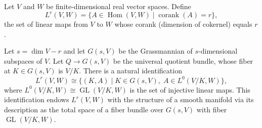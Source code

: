 Let $V$ and $W$ be finite-dimensional real vector spaces. Define
$$
L^r(V, W) = \{ A \in \operatorname{Hom}(V, W) \mid \operatorname{corank}(A) = r \},
$$
the set of linear maps from $V$ to $W$ whose corank (dimension of cokernel) equals $r$.

Let $s = \dim V - r$ and let $G(s, V)$ be the Grassmannian of $s$-dimensional subspaces of $V$. Let $Q \to G(s, V)$ be the universal quotient bundle, whose fiber at $K \in G(s, V)$ is $V/K$. There is a natural identification
$$
L^r(V, W) \cong \{ (K, A) \mid K \in G(s, V),\; A \in L^0(V/K, W) \},
$$
where $L^0(V/K, W) \cong \operatorname{GL}(V/K, W)$ is the set of injective linear maps. This identification endows $L^r(V, W)$ with the structure of a smooth manifold via its description as the total space of a fiber bundle over $G(s, V)$ with fiber $\operatorname{GL}(V/K, W)$.
